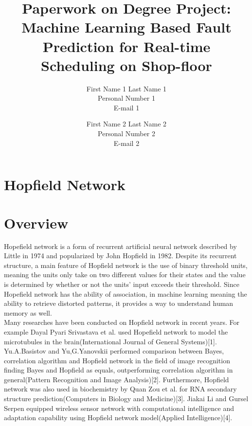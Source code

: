 \documentclass[a4paper,12pt,oneside,onecolumn]{article} %
\begin{document}

\title{Paperwork on Degree Project: Machine Learning Based Fault Prediction for Real-time Scheduling on Shop-floor}
\author{
  First Name 1 Last Name 1 \\ Personal Number 1 \\ E-mail 1 
  \and 
  First Name 2 Last Name 2 \\ Personal Number 2 \\ E-mail 2
  }

\maketitle                     %





\section*{Hopfield Network}

\section*{Overview}
Hopefield network is a form of recurrent artificial neural network described by Little in 1974 and popularized by John Hopfield in 1982. Despite its recurrent structure, a main feature of Hopfield network is the use of binary threshold units, meaning the units only take on two different values for their states and the value is determined by whether or not the units' input exceeds their threshold. Since Hopefield network has the ability of association, in machine learning meaning the ability to retrieve distorted patterns, it provides a way to understand human memory as well. \\
Many researches have been conducted on Hopfield network in recent years. For example Dayal Pyari Srivastava et al. used Hopefield network to model the microtubules in the brain(International Journal of General Systems)[1]. Yu.A.Basistov and Yu,G.Yanovskii performed comparison between Bayes, correlation algorithm and Hopfield network in the field of image recognition finding Bayes and Hopfield as equals, outperforming correlation algorithm in general(Pattern Recognition and Image Analysis)[2]. Furthermore, Hopfield network was also used in biochemistry by Quan Zou et al. for RNA secondary structure prediction(Computers in Biology and Medicine)[3]. Jiakai Li and Gursel Serpen equipped wireless sensor network with computational intelligence and adaptation capability using Hopfield network model(Applied Intelligence)[4].
\end{document}
